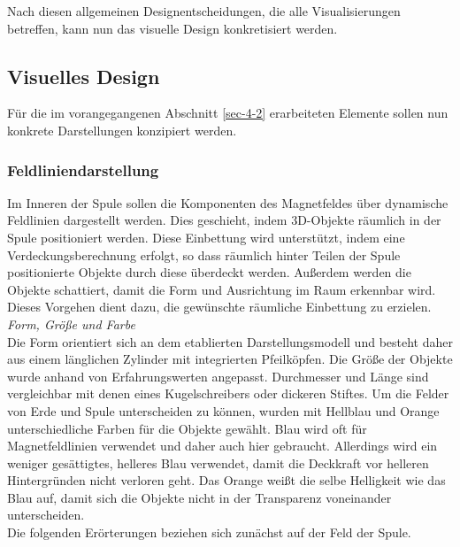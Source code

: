 Nach diesen allgemeinen Designentscheidungen, die alle Visualisierungen betreffen, kann nun das visuelle Design konkretisiert werden.

\subsection{Visuelles Design}
Für die im vorangegangenen Abschnitt \ref{sec-4-2} erarbeiteten Elemente sollen nun konkrete Darstellungen konzipiert werden.\\

\subsubsection{Feldliniendarstellung}
\label{sec-4-4-1}
Im Inneren der Spule sollen die Komponenten des Magnetfeldes über dynamische Feldlinien dargestellt werden. Dies geschieht, indem 3D-Objekte räumlich in der Spule positioniert werden. Diese Einbettung wird unterstützt, indem eine Verdeckungsberechnung erfolgt, so dass räumlich hinter Teilen der Spule positionierte Objekte durch diese überdeckt werden. Außerdem werden die Objekte schattiert, damit die Form und Ausrichtung im Raum erkennbar wird. Dieses Vorgehen dient dazu, die gewünschte räumliche Einbettung zu erzielen.\\

\textit{Form, Größe und Farbe}\\
Die Form orientiert sich an dem etablierten Darstellungsmodell und besteht daher aus einem länglichen Zylinder mit integrierten Pfeilköpfen. Die Größe der Objekte wurde anhand von Erfahrungswerten angepasst. Durchmesser und Länge sind vergleichbar mit denen eines Kugelschreibers oder dickeren Stiftes. Um die Felder von Erde und Spule unterscheiden zu können, wurden mit Hellblau und Orange unterschiedliche Farben für die Objekte gewählt. Blau wird oft für Magnetfeldlinien verwendet und daher auch hier gebraucht. Allerdings wird ein weniger gesättigtes, helleres Blau verwendet, damit die Deckkraft vor helleren Hintergründen nicht verloren geht. Das Orange weißt die selbe Helligkeit wie das Blau auf, damit sich die Objekte nicht in der Transparenz voneinander unterscheiden.\\
\noindent\hspace*{5mm}
Die folgenden Erörterungen beziehen sich zunächst auf der Feld der Spule.\\

